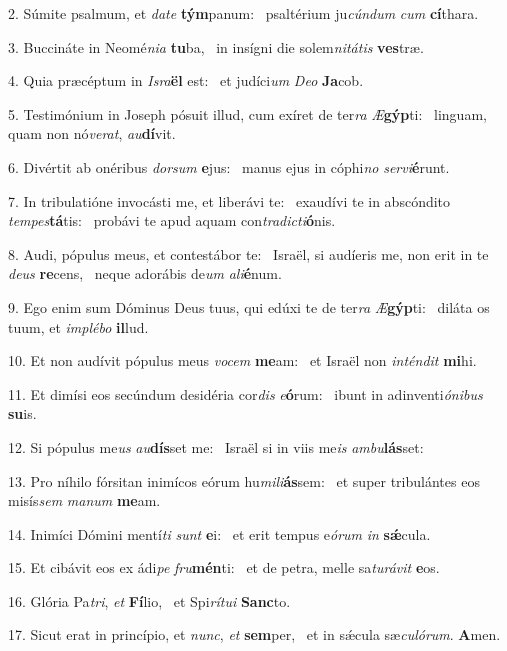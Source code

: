 2. Súmite psalmum, et \textit{da}\textit{te} \textbf{tým}panum: \ast\  psaltérium ju\textit{cún}\textit{dum} \textit{cum} \textbf{cí}thara.\

3. Buccináte in Neomé\textit{ni}\textit{a} \textbf{tu}ba, \ast\  in insígni die solem\textit{ni}\textit{tá}\textit{tis} \textbf{ves}træ.\

4. Quia præcéptum in \textit{Is}\textit{ra}\textbf{ël} est: \ast\  et judíci\textit{um} \textit{De}\textit{o} \textbf{Ja}cob.\

5. Testimónium in Joseph pósuit illud, cum exíret de ter\textit{ra} \textit{Æ}\textbf{gýp}ti: \ast\  linguam, quam non nó\textit{ve}\textit{rat}, \textit{au}\textbf{dí}vit.\

6. Divértit ab onéribus \textit{dor}\textit{sum} \textbf{e}jus: \ast\  manus ejus in cóphi\textit{no} \textit{ser}\textit{vi}\textbf{é}runt.\

7. In tribulatióne invocásti me, et liberávi te: \dag\  exaudívi te in abscóndito \textit{tem}\textit{pes}\textbf{tá}tis: \ast\  probávi te apud aquam con\textit{tra}\textit{dic}\textit{ti}\textbf{ó}nis.\

8. Audi, pópulus meus, et contestábor te: \dag\  Israël, si audíeris me, non erit in te \textit{de}\textit{us} \textbf{re}cens, \ast\  neque adorábis de\textit{um} \textit{a}\textit{li}\textbf{é}num.\

9. Ego enim sum Dóminus Deus tuus, qui edúxi te de ter\textit{ra} \textit{Æ}\textbf{gýp}ti: \ast\  diláta os tuum, et \textit{im}\textit{plé}\textit{bo} \textbf{il}lud.\

10. Et non audívit pópulus meus \textit{vo}\textit{cem} \textbf{me}am: \ast\  et Israël non \textit{in}\textit{tén}\textit{dit} \textbf{mi}hi.\

11. Et dimísi eos secúndum desidéria cor\textit{dis} \textit{e}\textbf{ó}rum: \ast\  ibunt in adinventi\textit{ó}\textit{ni}\textit{bus} \textbf{su}is.\

12. Si pópulus me\textit{us} \textit{au}\textbf{dís}set me: \ast\  Israël si in viis me\textit{is} \textit{am}\textit{bu}\textbf{lás}set:\

13. Pro níhilo fórsitan inimícos eórum hu\textit{mi}\textit{li}\textbf{ás}sem: \ast\  et super tribulántes eos misís\textit{sem} \textit{ma}\textit{num} \textbf{me}am.\

14. Inimíci Dómini mentí\textit{ti} \textit{sunt} \textbf{e}i: \ast\  et erit tempus e\textit{ó}\textit{rum} \textit{in} \textbf{sǽ}cula.\

15. Et cibávit eos ex ádi\textit{pe} \textit{fru}\textbf{mén}ti: \ast\  et de petra, melle sa\textit{tu}\textit{rá}\textit{vit} \textbf{e}os.\

16. Glória Pa\textit{tri}, \textit{et} \textbf{Fí}lio, \ast\  et Spi\textit{rí}\textit{tu}\textit{i} \textbf{Sanc}to.\

17. Sicut erat in princípio, et \textit{nunc}, \textit{et} \textbf{sem}per, \ast\  et in sǽcula sæ\textit{cu}\textit{ló}\textit{rum}. \textbf{A}men.\

